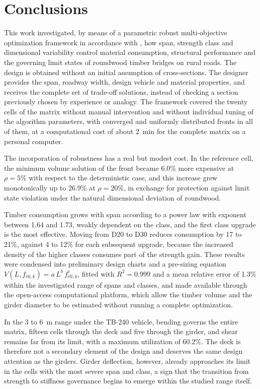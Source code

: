 \section{Conclusions}\label{sec:conclusoes}

This work investigated, by means of a parametric robust multi-objective optimization framework in accordance with \textcite{NBR7190-1:2022}, how span, strength class and dimensional variability control material consumption, structural performance and the governing limit states of roundwood timber bridges on rural roads.
The design is obtained without an initial assumption of cross-sections. The designer provides the span, roadway width, design vehicle and material properties, and receives the complete set of trade-off solutions, instead of checking a section previously chosen by experience or analogy.
The framework covered the twenty cells of the matrix without manual intervention and without individual tuning of the algorithm parameters, with converged and uniformly distributed fronts in all of them, at a computational cost of about 2~min for the complete matrix on a personal computer.

The incorporation of robustness has a real but modest cost.
In the reference cell, the minimum volume solution of the front became 6.0\% more expensive at $\rho = 5\%$ with respect to the deterministic case, and this increase grew monotonically up to 26.9\% at $\rho = 20\%$, in exchange for protection against limit state violation under the natural dimensional deviation of roundwood.

Timber consumption grows with span according to a power law with exponent between 1.64 and 1.73, weakly dependent on the class, and the first class upgrade is the most effective. Moving from D20 to D30 reduces consumption by 17 to 21\%, against 4 to 12\% for each subsequent upgrade, because the increased density of the higher classes consumes part of the strength gain.
These results were condensed into preliminary design charts and a pre-sizing equation $V(L, f_{c0,k}) = a\,L^{b}\,f_{c0,k}^{c}$, fitted with $R^2 = 0.999$ and a mean relative error of 1.3\% within the investigated range of spans and classes, and made available through the open-access computational platform, which allow the timber volume and the girder diameter to be estimated without running a complete optimization.

In the 3 to 6~m range under the TB-240 vehicle, bending governs the entire matrix, fifteen cells through the deck and five through the girder, and shear remains far from its limit, with a maximum utilization of 60.2\%.
The deck is therefore not a secondary element of the design and deserves the same design attention as the girders.
Girder deflection, however, already approaches its limit in the cells with the most severe span and class, a sign that the transition from strength to stiffness governance begins to emerge within the studied range itself.

